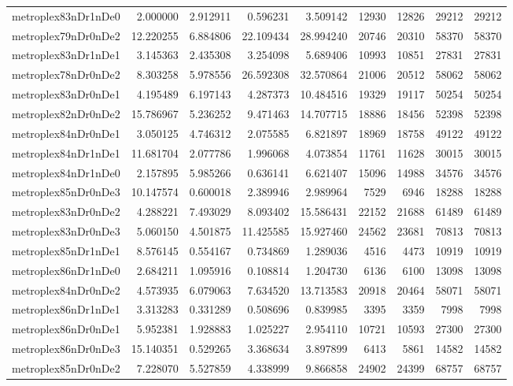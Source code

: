 \begin{longtable}{|l|r|r|r|r|r|r|r|r|}
metroplex83nDr1nDe0 & 2.000000 & 2.912911 & 0.596231 & 3.509142 & 12930 & 12826 & 29212 & 29212 \\
metroplex79nDr0nDe2 & 12.220255 & 6.884806 & 22.109434 & 28.994240 & 20746 & 20310 & 58370 & 58370 \\
metroplex83nDr1nDe1 & 3.145363 & 2.435308 & 3.254098 & 5.689406 & 10993 & 10851 & 27831 & 27831 \\
metroplex78nDr0nDe2 & 8.303258 & 5.978556 & 26.592308 & 32.570864 & 21006 & 20512 & 58062 & 58062 \\
metroplex83nDr0nDe1 & 4.195489 & 6.197143 & 4.287373 & 10.484516 & 19329 & 19117 & 50254 & 50254 \\
metroplex82nDr0nDe2 & 15.786967 & 5.236252 & 9.471463 & 14.707715 & 18886 & 18456 & 52398 & 52398 \\
metroplex84nDr0nDe1 & 3.050125 & 4.746312 & 2.075585 & 6.821897 & 18969 & 18758 & 49122 & 49122 \\
metroplex84nDr1nDe1 & 11.681704 & 2.077786 & 1.996068 & 4.073854 & 11761 & 11628 & 30015 & 30015 \\
metroplex84nDr1nDe0 & 2.157895 & 5.985266 & 0.636141 & 6.621407 & 15096 & 14988 & 34576 & 34576 \\
metroplex85nDr0nDe3 & 10.147574 & 0.600018 & 2.389946 & 2.989964 & 7529 & 6946 & 18288 & 18288 \\
metroplex83nDr0nDe2 & 4.288221 & 7.493029 & 8.093402 & 15.586431 & 22152 & 21688 & 61489 & 61489 \\
metroplex83nDr0nDe3 & 5.060150 & 4.501875 & 11.425585 & 15.927460 & 24562 & 23681 & 70813 & 70813 \\
metroplex85nDr1nDe1 & 8.576145 & 0.554167 & 0.734869 & 1.289036 & 4516 & 4473 & 10919 & 10919 \\
metroplex86nDr1nDe0 & 2.684211 & 1.095916 & 0.108814 & 1.204730 & 6136 & 6100 & 13098 & 13098 \\
metroplex84nDr0nDe2 & 4.573935 & 6.079063 & 7.634520 & 13.713583 & 20918 & 20464 & 58071 & 58071 \\
metroplex86nDr1nDe1 & 3.313283 & 0.331289 & 0.508696 & 0.839985 & 3395 & 3359 & 7998 & 7998 \\
metroplex86nDr0nDe1 & 5.952381 & 1.928883 & 1.025227 & 2.954110 & 10721 & 10593 & 27300 & 27300 \\
metroplex86nDr0nDe3 & 15.140351 & 0.529265 & 3.368634 & 3.897899 & 6413 & 5861 & 14582 & 14582 \\
metroplex85nDr0nDe2 & 7.228070 & 5.527859 & 4.338999 & 9.866858 & 24902 & 24399 & 68757 & 68757 \\

\end{longtable}
